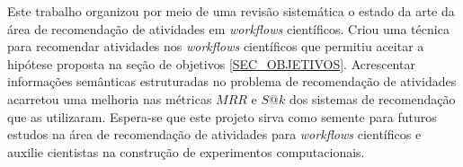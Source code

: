 Este trabalho organizou por meio de uma revisão sistemática o estado da arte da área de recomendação de atividades em \emph{workflows} científicos. Criou uma técnica para recomendar atividades nos \emph{workflows} científicos que permitiu aceitar a hipótese proposta na seção de objetivos \ref{SEC_OBJETIVOS}. Acrescentar informações semânticas estruturadas no problema de recomendação de atividades acarretou uma melhoria nas métricas \(MRR\) e \(S@k\) dos sistemas de recomendação que as utilizaram. Espera-se que este projeto sirva como semente para futuros estudos na área de recomendação de atividades para \emph{workflows} científicos e auxilie cientistas na construção de experimentos computacionais.
